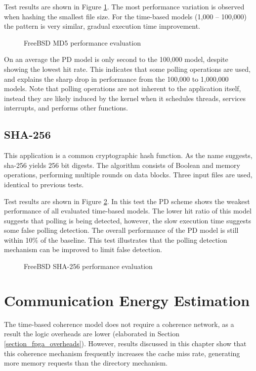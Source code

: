 		Test results are shown in Figure \ref{md5_freebsd_full}. The most performance variation is observed when hashing the smallest file size. For the time-based models (1,000 -- 100,000) the pattern is very similar, gradual execution time improvement. 
		
		\begin{figure}[!ht]
		\centering 
			\caption{FreeBSD MD5 performance evaluation} 
			\label{md5_freebsd_full}
		\end{figure}
		
		On an average the PD model is only second to the 100,000 model, despite showing the lowest hit rate. This indicates that some polling operations are used, and explains the sharp drop in performance from the 100,000 to 1,000,000 models. Note that polling operations are not inherent to the application itself, instead they are likely induced by the kernel when it schedules threads, services interrupts, and performs other functions.

			
	\subsection{SHA-256}
		\label{results_sha}
		This application is a common cryptographic hash function. As the name suggests, sha-256 yields 256 bit digests. The algorithm consists of Boolean and memory operations, performing multiple rounds on data blocks. Three input files are used, identical to previous tests.
		
		Test results are shown in Figure \ref{sha_freebsd_full}. In this test the PD scheme shows the weakest performance of all evaluated time-based models. The lower hit ratio of this model suggests that polling is being detected, however, the slow execution time suggests some false polling detection. The overall performance of the PD model is still within 10\% of the baseline. This test illustrates that the polling detection mechanism can be improved to limit false detection.

		\begin{figure}[!ht]
		\centering 
			\caption{FreeBSD SHA-256 performance evaluation} 
			\label{sha_freebsd_full}
		\end{figure}

	\section{Communication Energy Estimation}
		The time-based coherence model does not require a coherence network, as a result the logic overheads are lower (elaborated in Section \ref{section_fpga_overheads}). However, results discussed in this chapter show that this coherence mechanism frequently increases the cache miss rate, generating more memory requests than the directory mechanism. 
		
